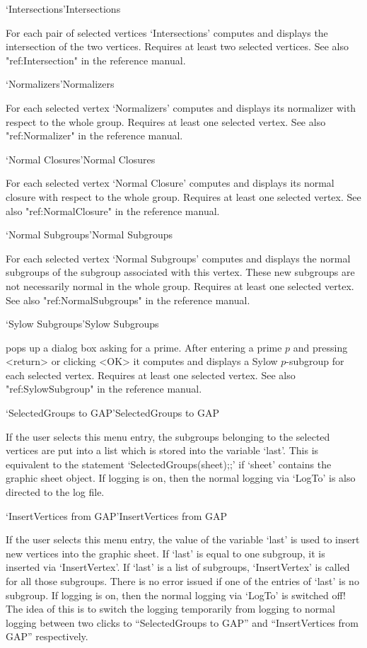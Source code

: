 \>`Intersections'{Intersections}

For each pair of selected vertices `Intersections' computes and displays
the intersection of the two vertices.  Requires at least two selected
vertices.  See also "ref:Intersection" in the {\GAP}
reference manual.

\>`Normalizers'{Normalizers}

For each selected vertex `Normalizers' computes and displays its normalizer
with respect to the whole group.  Requires at least one selected vertex.
See also "ref:Normalizer" in the {\GAP}
reference manual.

\>`Normal Closures'{Normal Closures}

For each selected vertex `Normal Closure' computes and displays its normal
closure with respect to the whole group.  Requires at least one selected
vertex.  See also "ref:NormalClosure" in the {\GAP}
reference manual.

\>`Normal Subgroups'{Normal Subgroups}

For   each selected vertex `Normal  Subgroups'  computes and displays the
normal subgroups of the subgroup associated  with this vertex.  These new
subgroups are not  necessarily  normal in the  whole  group.  Requires at
least one selected vertex.  See also "ref:NormalSubgroups" in the {\GAP}
reference manual.

\>`Sylow Subgroups'{Sylow Subgroups}

pops  up a dialog  box asking   for a prime.   After entering  a  prime $p$ 
and pressing  <return> or  clicking  <OK> it computes   and displays  a Sylow
$p$-subgroup  for   each selected vertex.  Requires   at   least one selected
vertex.  See also "ref:SylowSubgroup" in the {\GAP}
reference manual.

\>`SelectedGroups to GAP'{SelectedGroups to GAP}

If  the  user  selects  this menu entry,  the  subgroups   belonging to the
selected  vertices are put into a  list which  is  stored into the variable
`last'.  This is equivalent  to the  statement `SelectedGroups(sheet);;' if
`sheet' contains the graphic sheet  object. If {\XGAP}  logging is on, then
the normal {\GAP} logging via `LogTo'  is also directed  to the {\XGAP} log
file.

\>`InsertVertices from GAP'{InsertVertices from GAP}

If the user selects this  menu entry, the  value of the variable `last'  is
used to insert new vertices into the graphic sheet.  If  `last' is equal to
one subgroup, it  is inserted via  `InsertVertex'. If `last'  is a list  of
subgroups, `InsertVertex' is  called for all  those subgroups. There is  no
error  issued if one of  the entries of `last'   is no subgroup. If {\XGAP}
logging is on, then the normal {\GAP} logging via `LogTo'  is switched off! 
The idea of this is to switch  the logging temporarily from {\XGAP} logging
to normal  {\GAP} logging between two clicks  to  ``SelectedGroups to GAP''
and ``InsertVertices from GAP'' respectively.

